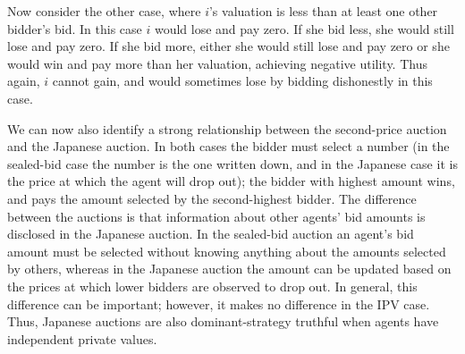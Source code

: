 Now consider the
other case, where $i$'s valuation is less than at least one other bidder's bid. In
this case $i$ would lose and pay zero. If she bid less, she would still lose and pay zero. If she bid more, either she would still lose and pay zero or she would win and pay more than her valuation, achieving negative utility. Thus again, $i$ cannot gain, and would sometimes lose by bidding dishonestly in this case. 

We can now also identify a strong relationship between the second-price auction and the Japanese 
auction. 
In both cases the bidder must select a number
(in the sealed-bid case the number is the one written down, and in the Japanese case it is the price at which the agent will drop out); the bidder with highest amount wins, and pays the amount selected by the second-highest bidder. The difference between
the auctions is that information about other agents' bid amounts is disclosed in the Japanese auction. In the sealed-bid auction an agent's bid amount must be selected without knowing anything about the amounts selected by others, whereas in the Japanese auction the amount can be updated based on the prices at which lower bidders are observed to drop out. In general, this difference can be important; however, it makes no difference in the IPV case. Thus, Japanese
auctions are also dominant-strategy truthful when agents have independent private
values.



